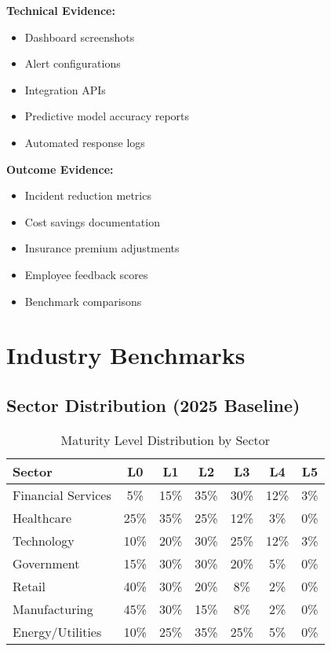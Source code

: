 \documentclass[11pt,a4paper]{article}
\begin{document}
\textbf{Technical Evidence:}
\begin{itemize}
\item Dashboard screenshots
\item Alert configurations
\item Integration APIs
\item Predictive model accuracy reports
\item Automated response logs
\end{itemize}

\textbf{Outcome Evidence:}
\begin{itemize}
\item Incident reduction metrics
\item Cost savings documentation
\item Insurance premium adjustments
\item Employee feedback scores
\item Benchmark comparisons
\end{itemize}

\section{Industry Benchmarks}

\subsection{Sector Distribution (2025 Baseline)}

\begin{table}[h]
\centering
\caption{Maturity Level Distribution by Sector}
\small
\begin{tabular}{lcccccc}
\toprule
\textbf{Sector} & \textbf{L0} & \textbf{L1} & \textbf{L2} & \textbf{L3} & \textbf{L4} & \textbf{L5} \\
\midrule
Financial Services & 5\% & 15\% & 35\% & 30\% & 12\% & 3\% \\
Healthcare & 25\% & 35\% & 25\% & 12\% & 3\% & 0\% \\
Technology & 10\% & 20\% & 30\% & 25\% & 12\% & 3\% \\
Government & 15\% & 30\% & 30\% & 20\% & 5\% & 0\% \\
Retail & 40\% & 30\% & 20\% & 8\% & 2\% & 0\% \\
Manufacturing & 45\% & 30\% & 15\% & 8\% & 2\% & 0\% \\
Energy/Utilities & 10\% & 25\% & 35\% & 25\% & 5\% & 0\% \\
\bottomrule
\end{tabular}
\end{table}
\end{document}
